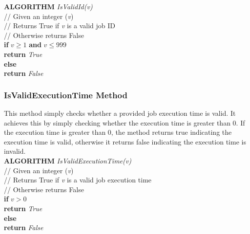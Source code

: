 \documentclass[12pt,a4paper]{article}
\begin{document}
				\textbf{ALGORITHM} \textit{IsValidId(v)}\\
				\null\hspace{1cm}// Given an integer (\textit{v})\\
				\null\hspace{1cm}// Returns True if \textit{v} is a valid job ID\\
				\null\hspace{1cm}// Otherwise returns False\\
				\null\hspace{1cm}\textbf{if} \textit{$v \geq 1$} \textbf{and} \textit{$v \leq 999$}\\
				\null\hspace{2cm}\textbf{return} \textit{True}\\
				\null\hspace{1cm}\textbf{else}\\
				\null\hspace{2cm}\textbf{return} \textit{False}\\

			\subsubsection{IsValidExecutionTime Method}
				This method simply checks whether a provided job execution time is valid. It achieves 
				this by simply checking whether the execution time is greater than 0. If the execution 
				time is greater than 0, the method returns true indicating the execution time is valid,
				otherwise it returns false indicating the execution time is invalid.\\

				\textbf{ALGORITHM} \textit{IsValidExecutionTime(v)}\\
				\null\hspace{1cm}// Given an integer (\textit{v})\\
				\null\hspace{1cm}// Returns True if \textit{v} is a valid job execution time\\
				\null\hspace{1cm}// Otherwise returns False\\
				\null\hspace{1cm}\textbf{if} \textit{$v > 0$}\\
				\null\hspace{2cm}\textbf{return} \textit{True}\\
				\null\hspace{1cm}\textbf{else}\\
				\null\hspace{2cm}\textbf{return} \textit{False}
\end{document}
